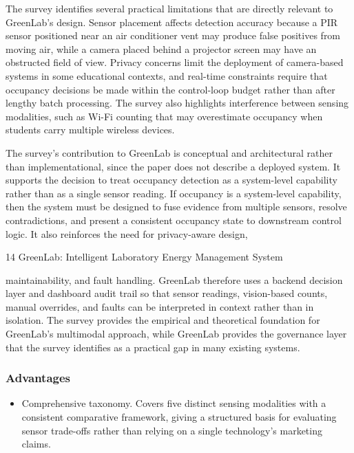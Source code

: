The survey identiﬁes several practical limitations that are directly relevant to GreenLab's design. Sensor placement affects detection accuracy because a PIR sensor positioned
near an air conditioner vent may produce false positives from moving air, while a camera
placed behind a projector screen may have an obstructed ﬁeld of view. Privacy concerns
limit the deployment of camera-based systems in some educational contexts, and real-time
constraints require that occupancy decisions be made within the control-loop budget rather
than after lengthy batch processing. The survey also highlights interference between sensing modalities, such as Wi-Fi counting that may overestimate occupancy when students
carry multiple wireless devices.

The survey's contribution to GreenLab is conceptual and architectural rather than implementational, since the paper does not describe a deployed system. It supports the decision to treat occupancy detection as a system-level capability rather than as a single sensor
reading. If occupancy is a system-level capability, then the system must be designed to fuse
evidence from multiple sensors, resolve contradictions, and present a consistent occupancy
state to downstream control logic. It also reinforces the need for privacy-aware design,

14
GreenLab: Intelligent Laboratory Energy Management System


maintainability, and fault handling. GreenLab therefore uses a backend decision layer and
dashboard audit trail so that sensor readings, vision-based counts, manual overrides, and
faults can be interpreted in context rather than in isolation. The survey provides the empirical and theoretical foundation for GreenLab's multimodal approach, while GreenLab
provides the governance layer that the survey identiﬁes as a practical gap in many existing
systems.




\subsubsection*{Advantages}



\begin{itemize}
  \item Comprehensive taxonomy. Covers ﬁve distinct sensing modalities with a consistent
comparative framework, giving a structured basis for evaluating sensor trade-offs
rather than relying on a single technology's marketing claims.
\end{itemize}


